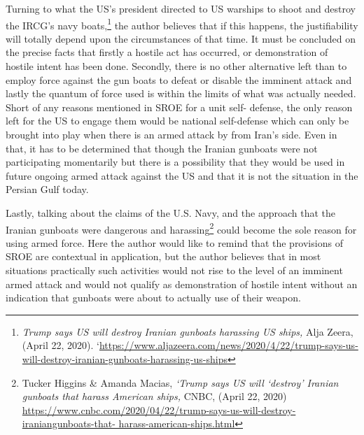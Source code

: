 \begin{multicols}{2}
\noi
Turning to what the US’s president directed to US warships to shoot and destroy the IRCG’s
navy boats,\footnote{\textit{Trump says US will destroy Iranian gunboats harassing US ships,} Alja Zeera, (April 22, 2020).
‘\url{https://www.aljazeera.com/news/2020/4/22/trump-says-us-will-destroy-iranian-gunboats-harassing-us-ships}} the author believes that if this happens, the justifiability will totally depend
upon the circumstances of that time. It must be concluded on the precise facts that firstly a hostile
act has occurred, or demonstration of hostile intent has been done. Secondly, there is no
other alternative left than to employ force against the gun boats to defeat or disable the
imminent attack and lastly the quantum of force used is within the limits of what was
actually needed. Short of any reasons mentioned in SROE for a unit self- defense, the only reason left for the US to engage them would be national self-defense which can only be
brought into play when there is an armed attack by from Iran’s side. Even in that, it has to
be determined that though the Iranian gunboats were not participating momentarily but
there is a possibility that they would be used in future ongoing armed attack against the US
and that it is not the situation in the Persian Gulf today.

\noi
Lastly, talking about the claims of the U.S. Navy, and the approach that the Iranian
gunboats were dangerous and harassing\footnote{Tucker Higgins \& Amanda Macias, \textit{‘Trump says US will ‘destroy’ Iranian gunboats that harass American
ships,} CNBC, (April 22, 2020) \url{https://www.cnbc.com/2020/04/22/trump-says-us-will-destroy-iraniangunboats-that- harass-american-ships.html}} could become the sole reason for using armed
force. Here the author would like to remind that the provisions of SROE are contextual in
application, but the author believes that in most situations practically such activities would
not rise to the level of an imminent armed attack and would not qualify as demonstration of
hostile intent without an indication that gunboats were about to actually use of their
weapon.



\end{multicols}
